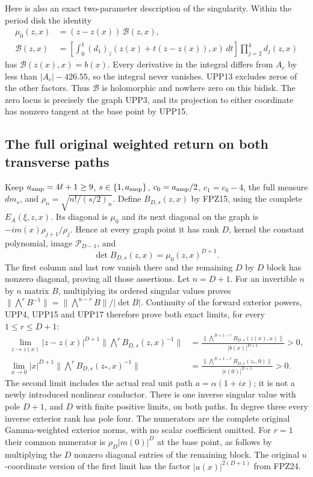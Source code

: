 \documentclass[11pt]{article}
\begin{document}
Here is also an exact two-parameter description of the singularity.
Within the period disk the identity
\[
 \begin{aligned}
 \mu_0(z,x)&=(z-z(x))\,\mathcal B(z,x),\\
 \mathcal B(z,x)&=
 \left[\int_0^1(d_1)_z(z(x)+t(z-z(x)),x)\,dt\right]
                  \prod_{j=2}^4d_j(z,x)
 \end{aligned}\tag{UPP16}
\]
has $\mathcal B(z(x),x)=b(x)$.
Every derivative in the integral differs from $A_c$ by less than
$|A_c|-426.55$, so the integral never vanishes. UPP13 excludes
zeros of the other factors. Thus $\mathcal B$ is holomorphic and
nowhere zero on this bidisk. The zero locus is precisely the graph
UPP3, and its projection to either coordinate has nonzero tangent
at the base point by UPP15.

\subsection{The full original weighted return on both transverse paths}
Keep $a_{\rm amp}=4\ell+1\ge9$, $s\in\{1,a_{\rm amp}\}$,
$c_0=a_{\rm amp}/2$, $c_1=c_0-4$, the full measure $dm_s$,
and $\rho_n=\sqrt{n!/(s/2)_n}$. Define $B_{D,s}(z,x)$ by FPZ15,
using the complete $E_A(\xi,z,x)$. Its diagonal is $\mu_0$ and
its next diagonal on the graph is $-im(x)\rho_{j+1}/\rho_j$.
Hence at every graph point it has rank $D$, kernel the constant
polynomial, image $\mathcal P_{D-1}$, and
\[
 \det B_{D,s}(z,x)=\mu_0(z,x)^{D+1}.
 \tag{UPP17}
\]
The first column and last row vanish there and the remaining
$D$ by $D$ block has nonzero diagonal, proving all those assertions.
Let $n=D+1$. For an invertible $n$ by $n$ matrix $B$, multiplying
its ordered singular values proves
$\|\bigwedge^r B^{-1}\|=\|\bigwedge^{n-r}B\|/|\det B|$.
Continuity of the forward exterior powers, UPP4, UPP15 and UPP17
therefore prove both exact limits, for every $1\le r\le D+1$:
\[
 \begin{aligned}
 \lim_{z\to z(x)} |z-z(x)|^{D+1}
       \|\bigwedge^r B_{D,s}(z,x)^{-1}\|
 &=\frac{\|\bigwedge^{D+1-r}B_{D,s}(z(x),x)\|}{|b(x)|^{D+1}}>0,\\
 \lim_{x\to0} |x|^{D+1}
       \|\bigwedge^r B_{D,s}(z_*,x)^{-1}\|
 &=\frac{\|\bigwedge^{D+1-r}B_{D,s}(z_*,0)\|}{|e(0)|^{D+1}}>0.
 \end{aligned}\tag{UPP18}
\]
The second limit includes the actual real unit path
$a=\alpha(1+ix)$; it is not a newly introduced nonlinear conductor.
There is one inverse singular value with pole $D+1$, and $D$ with
finite positive limits, on both paths. In degree three every inverse
exterior rank has pole four. The numerators are the complete original
Gamma-weighted exterior norms, with no scalar coefficient omitted.
For $r=1$ their common numerator is $\rho_D|m(0)|^D$ at the base
point, as follows by multiplying the $D$ nonzero diagonal entries
of the remaining block. The original $u$-coordinate version of the
first limit has the factor $|u(x)|^{2(D+1)}$ from FPZ24.
\end{document}
